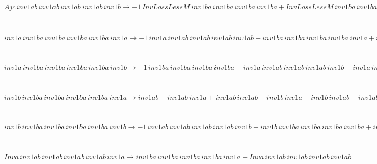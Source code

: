 \begin{minipage}{6in}
$
Ajc\,
 inv1ab\,
 inv1ab\,
 inv1ab\,
 inv1ab\,
 inv1b\rightarrow -1\,
 InvLossLessM\,
 inv1ba\,
 inv1ba\,
 inv1ba\,
 inv1ba + InvLossLessM\,
 inv1ba\,
 inv1ba\,
 inv1ba\,
 inv1ba\,
 inv1b
$
\end{minipage}\medskip \\
\begin{minipage}{6in}
$
inv1a\,
 inv1ba\,
 inv1ba\,
 inv1ba\,
 inv1ba\,
 inv1a\rightarrow -1\,
 inv1a\,
 inv1ab\,
 inv1ab\,
 inv1ab\,
 inv1ab + inv1ba\,
 inv1ba\,
 inv1ba\,
 inv1ba\,
 inv1a + inv1a\,
 inv1ab\,
 inv1ab\,
 inv1ab\,
 inv1ab\,
 inv1a
$
\end{minipage}\medskip \\
\begin{minipage}{6in}
$
inv1a\,
 inv1ba\,
 inv1ba\,
 inv1ba\,
 inv1ba\,
 inv1b\rightarrow -1\,
 inv1ba\,
 inv1ba\,
 inv1ba\,
 inv1ba - inv1a\,
 inv1ab\,
 inv1ab\,
 inv1ab\,
 inv1b + inv1a\,
 inv1ba\,
 inv1ba\,
 inv1ba\,
 inv1ba + inv1ba\,
 inv1ba\,
 inv1ba\,
 inv1ba\,
 inv1b + inv1a\,
 inv1ab\,
 inv1ab\,
 inv1ab\,
 inv1ab\,
 inv1b
$
\end{minipage}\medskip \\
\begin{minipage}{6in}
$
inv1b\,
 inv1ba\,
 inv1ba\,
 inv1ba\,
 inv1ba\,
 inv1a\rightarrow inv1ab - inv1ab\,
 inv1a + inv1ab\,
 inv1ab + inv1b\,
 inv1a - inv1b\,
 inv1ab - inv1ab\,
 inv1ab\,
 inv1a + inv1ab\,
 inv1ab\,
 inv1ab + inv1b\,
 inv1ab\,
 inv1a - inv1b\,
 inv1ab\,
 inv1ab - inv1ab\,
 inv1ab\,
 inv1ab\,
 inv1a + inv1ab\,
 inv1ab\,
 inv1ab\,
 inv1ab + inv1b\,
 inv1ab\,
 inv1ab\,
 inv1a - inv1b\,
 inv1ab\,
 inv1ab\,
 inv1ab - inv1ab\,
 inv1ab\,
 inv1ab\,
 inv1ab\,
 inv1a + inv1b\,
 inv1ab\,
 inv1ab\,
 inv1ab\,
 inv1a - inv1b\,
 inv1ab\,
 inv1ab\,
 inv1ab\,
 inv1ab + inv1b\,
 inv1ab\,
 inv1ab\,
 inv1ab\,
 inv1ab\,
 inv1a
$
\end{minipage}\medskip \\
\begin{minipage}{6in}
$
inv1b\,
 inv1ba\,
 inv1ba\,
 inv1ba\,
 inv1ba\,
 inv1b\rightarrow -1\,
 inv1ab\,
 inv1ab\,
 inv1ab\,
 inv1ab\,
 inv1b + inv1b\,
 inv1ba\,
 inv1ba\,
 inv1ba\,
 inv1ba + inv1b\,
 inv1ab\,
 inv1ab\,
 inv1ab\,
 inv1ab\,
 inv1b
$
\end{minipage}\medskip \\
\begin{minipage}{6in}
$
Inva\,
 inv1ab\,
 inv1ab\,
 inv1ab\,
 inv1ab\,
 inv1a\rightarrow inv1ba\,
 inv1ba\,
 inv1ba\,
 inv1ba\,
 inv1a + Inva\,
 inv1ab\,
 inv1ab\,
 inv1ab\,
 inv1ab
$
\end{minipage}\medskip \\
